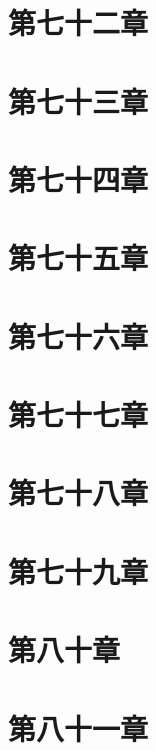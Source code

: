 \documentclass[UTF8]{ctexbook}
\begin{document}
	\section{第七十二章}
	\section{第七十三章}
	\section{第七十四章}
	\section{第七十五章}
	\section{第七十六章}
	\section{第七十七章}
	\section{第七十八章}
	\section{第七十九章}
	\section{第八十章}
	\section{第八十一章}
	
\end{document}
